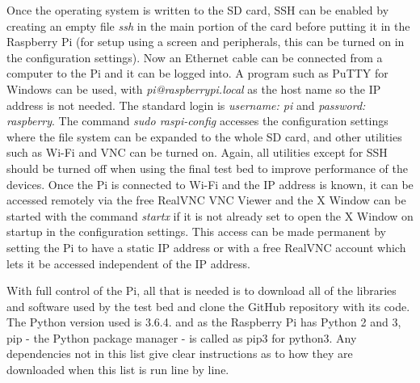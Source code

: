 \documentclass[../main.tex]{subfiles}
\begin{document}

Once the operating system is written to the SD card, SSH can be enabled by creating an empty file \textit{ssh} in the main portion of the card before putting it in the Raspberry Pi (for setup using a screen and peripherals, this can be turned on in the configuration settings).
Now an Ethernet cable can be connected from a computer to the Pi and it can be logged into.
A program such as PuTTY \cite{lib_PuTTY} for Windows can be used, with \textit{pi@raspberrypi.local} as the host name so the IP address is not needed.
The standard login is \textit{username: pi} and \textit{password: raspberry}.
The command \textit{sudo raspi-config} accesses the configuration settings where the file system can be expanded to the whole SD card, and other utilities such as Wi-Fi and VNC can be turned on.
Again, all utilities except for SSH should be turned off when using the final test bed to improve performance of the devices.
Once the Pi is connected to Wi-Fi and the IP address is known, it can be accessed remotely via the free RealVNC VNC Viewer \cite{lib_RealVNCViewer} and the X Window can be started with the command \textit{startx} if it is not already set to open the X Window on startup in the configuration settings.
This access can be made permanent by setting the Pi to have a static IP address or with a free RealVNC account which lets it be accessed independent of the IP address.\\

With full control of the Pi, all that is needed is to download all of the libraries and software used by the test bed and clone the GitHub repository with its code.
The Python version used is 3.6.4.
and as the Raspberry Pi has Python 2 and 3, pip - the Python package manager - is called as pip3 for python3.
Any dependencies not in this list give clear instructions as to how they are downloaded when this list is run line by line.\\
\end{document}
